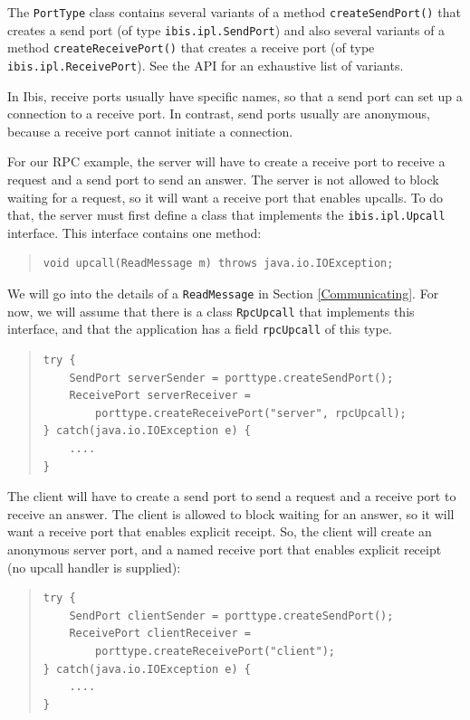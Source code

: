 \documentclass[10pt]{article}
\begin{document}
The \texttt{PortType} class contains several variants of a method
\texttt{createSendPort()} that creates a send port (of type
\texttt{ibis.ipl.SendPort}) and
also several variants of a method \texttt{createReceivePort()} that
creates a receive port (of type \texttt{ibis.ipl.ReceivePort}).
See the API for an exhaustive list of variants.

In Ibis, receive ports usually have specific names, so that
a send port can set up a connection to a receive port. In contrast,
send ports usually are anonymous, because a receive port cannot
initiate a connection.

For our RPC example, the server will have to create a receive port
to receive a request and a send port to send an answer.
The server is not allowed to block waiting for a request, so it will
want a receive port that enables upcalls.
To do that, the server must first define a class that implements
the \texttt{ibis.ipl.Upcall} interface. This interface contains one
method:

\begin{quote}
\begin{verbatim}
void upcall(ReadMessage m) throws java.io.IOException;
\end{verbatim}
\end{quote}

We will go into the details of a \texttt{ReadMessage} in Section
\ref{Communicating}. For now, we will assume that there is a
class \texttt{RpcUpcall} that implements this interface, and
that the application has a field \texttt{rpcUpcall} of this type.

\begin{quote}
\begin{verbatim}
try {
    SendPort serverSender = porttype.createSendPort();
    ReceivePort serverReceiver =
        porttype.createReceivePort("server", rpcUpcall);
} catch(java.io.IOException e) {
    ....
}
\end{verbatim}
\end{quote}

\noindent
The client will have to create a send port
to send a request and a receive port to receive an answer.
The client is allowed to block waiting for an answer, so it will
want a receive port that enables explicit receipt.
So, the client will create an anonymous server port, and a named
receive port that enables explicit receipt (no upcall handler is supplied):
\begin{quote}
\begin{verbatim}
try {
    SendPort clientSender = porttype.createSendPort();
    ReceivePort clientReceiver =
        porttype.createReceivePort("client");
} catch(java.io.IOException e) {
    ....
}
\end{verbatim}
\end{quote}
\end{document}
